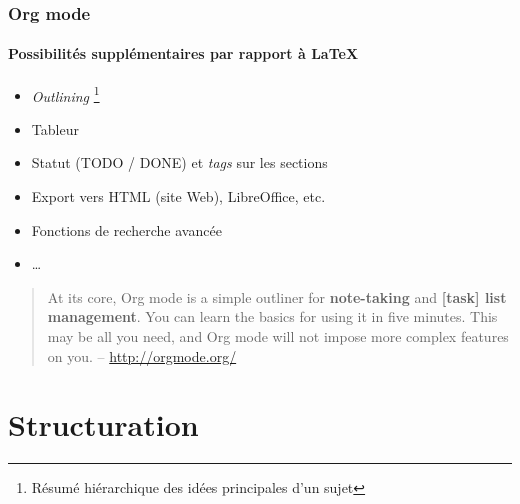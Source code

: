 \documentclass[presentation,t,hideothersubsections]{beamer}
\begin{document}
\begin{frame}
\frametitle{Org mode}
\framesubtitle{Possibilités supplémentaires par rapport à \LaTeX{}}
\label{sec-1-2-3}


\begin{itemize}
\item \emph{Outlining} \footnote{Résumé hiérarchique des idées principales d'un sujet
 }
\item Tableur
\item Statut (TODO / DONE) et \emph{tags} sur les sections
\item Export vers HTML (site Web), LibreOffice, etc.
\item Fonctions de recherche avancée
\item \ldots{}
\end{itemize}

\begin{quote}
At its core, Org mode is a simple outliner for \textbf{note-taking} and \textbf{[task] list management}. You can learn the basics for using it in five minutes. This may
be all you need, and Org mode will not impose more complex features on you.
-- \href{http://orgmode.org/}{http://orgmode.org/}
\end{quote}
\end{frame}
\section{Structuration}
\label{sec-2}
\end{document}
